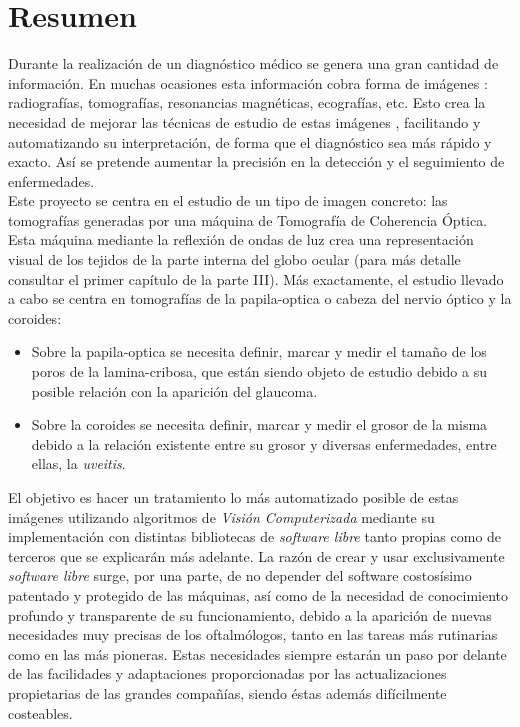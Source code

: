 \section*{Resumen}
Durante la realización de un diagnóstico médico se genera una gran
cantidad de información. En muchas ocasiones esta información cobra
forma de imágenes \emph{\citep*[1. The Analysis of Medical Images,
  2. Digital Image Acquisition]{toennies2012guide}}: radiografías,
tomografías, resonancias magnéticas, ecografías, etc. Esto crea la
necesidad de mejorar las técnicas de estudio de estas imágenes
\emph{\citep*[4. Image Enhancement]{toennies2012guide}}, facilitando y
automatizando su interpretación, de forma que el diagnóstico sea más
rápido y exacto. Así se pretende aumentar la precisión en la detección
y el seguimiento de enfermedades.\\
Este proyecto se centra en el estudio de un tipo de imagen concreto:
las tomografías generadas por una máquina de Tomografía de Coherencia
Óptica. Esta máquina mediante la reflexión de ondas de luz crea una
representación visual de los tejidos de la parte interna del globo
ocular (para más detalle consultar el primer capítulo de la parte
III). Más exactamente, el estudio llevado a cabo se centra en
tomografías de la \gls{papila-optica} o cabeza del nervio óptico y la
\gls{coroides}:
\begin{itemize}
\item Sobre la \gls{papila-optica} se necesita definir, marcar y medir
  el tamaño de los poros de la \gls{lamina-cribosa}, que están siendo
  objeto de estudio debido a su posible relación con la aparición del
  \gls{glaucoma}.
\item Sobre la \gls{coroides} se necesita definir, marcar y medir el
  grosor de la misma debido a la relación existente entre su grosor y
  diversas enfermedades, entre ellas, la \emph{\gls{uveitis}}.
\end{itemize}
El objetivo es hacer un tratamiento lo más automatizado posible de
estas imágenes utilizando algoritmos de \emph{Visión Computerizada}
mediante su implementación con distintas bibliotecas de \emph{software
  libre} tanto propias como de terceros que se explicarán más
adelante. La razón de crear y usar exclusivamente \emph{software
  libre} surge, por una parte, de no depender del software costosísimo
patentado y protegido de las máquinas, así como de la necesidad de
conocimiento profundo y transparente de su funcionamiento, debido a la
aparición de nuevas necesidades muy precisas de los oftalmólogos,
tanto en las tareas más rutinarias como en las más pioneras. Estas
necesidades siempre estarán un paso por delante de las facilidades y
adaptaciones proporcionadas por las actualizaciones propietarias de
las grandes compañías, siendo éstas además difícilmente costeables.

